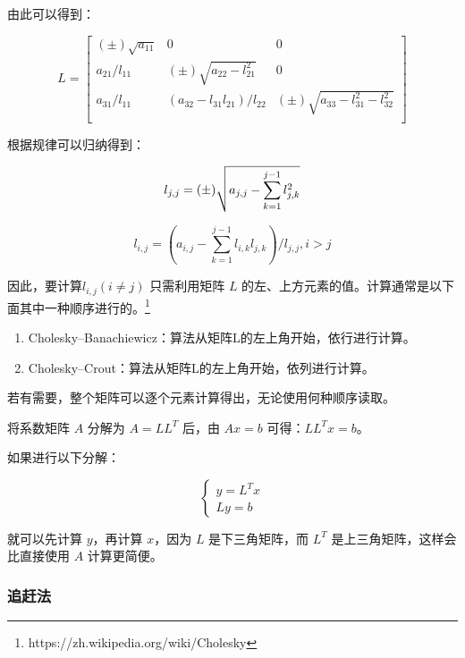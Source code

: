 由此可以得到：

\begin{equation*}
    L =
    \begin{bmatrix}
        (\pm) \sqrt{a_{11}} & 0                            & 0                                     \\
        a_{21} / l_{11}     & (\pm)\sqrt{a_{22}-l_{21}^2}  & 0                                     \\
        a_{31} / l_{11}     & (a_{32}-l_{31}l_{21})/l_{22} & (\pm) \sqrt{a_{33}-l_{31}^2-l_{32}^2} \\
    \end{bmatrix}
\end{equation*}

根据规律可以归纳得到：

\begin{equation*}
    l_{j,j} = (\pm) \sqrt{a_{j,j} - \sum_{k=1}^{j-1} l_{j,k}^2} \\
\end{equation*}

\[
    l_{i,j} = (a_{i,j} - \sum_{k=1}^{j-1}l_{i,k}l_{j,k}) / l_{j,j},  i > j
\]

因此，要计算${l}_{i,j}(i\neq j)$ 只需利用矩阵 $L$ 的左、上方元素的值。计算通常是以下面其中一种顺序进行的。\footnote{https://zh.wikipedia.org/wiki/Cholesky}

\begin{enumerate}
    \item Cholesky–Banachiewicz：算法从矩阵L的左上角开始，依行进行计算。
    \item Cholesky–Crout：算法从矩阵L的左上角开始，依列进行计算。
\end{enumerate}

若有需要，整个矩阵可以逐个元素计算得出，无论使用何种顺序读取。

将系数矩阵 \(A\) 分解为 \(A = L L^T\) 后，由 \(Ax = b\)
可得：\(LL^Tx = b\)。

如果进行以下分解：

\[
    \left\{\begin{matrix}
        y = L^Tx \\
        Ly = b
    \end{matrix}\right.
\]


就可以先计算 \(y\)，再计算 \(x\)，因为 \(L\) 是下三角矩阵，而 \(L^T\)
是上三角矩阵，这样会比直接使用 \(A\) 计算更简便。

\subsubsection{追赶法}

